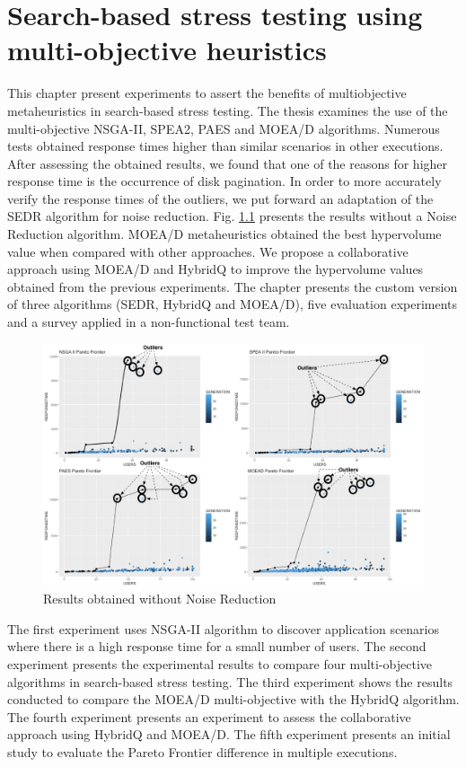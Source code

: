 \documentclass[espaco=umemeio,chapter=TITLE,twoside,openright]{abnt}
\begin{document}
\chapter{Search-based stress testing using multi-objective heuristics}

This chapter present experiments to assert the benefits of multiobjective metaheuristics in search-based stress testing. The thesis examines the use of the multi-objective NSGA-II, SPEA2, PAES and MOEA/D algorithms. Numerous tests obtained response times higher than similar scenarios in other executions. After assessing the obtained results, we found that one of the reasons for higher response time is the occurrence of disk pagination. In order to more accurately verify the response times of the outliers, we put forward an adaptation of the SEDR algorithm for noise reduction. Fig. \ref{fig:outliers} presents the results without a Noise Reduction algorithm.  MOEA/D metaheuristics obtained the best hypervolume value when compared with other approaches. We propose a collaborative approach using MOEA/D and HybridQ to improve the hypervolume values obtained from the previous experiments. The chapter presents the custom version of three algorithms (SEDR, HybridQ and MOEA/D), five evaluation experiments and a survey applied in a non-functional test team.


\begin{figure}[!h]
\centering
\includegraphics[width=1\textwidth]{./images/outliers.png}
\caption{Results obtained without Noise Reduction}
\label{fig:outliers}
\end{figure}


The first experiment uses NSGA-II algorithm to discover application scenarios where there is a high response time for a small number of users. The second experiment presents the experimental results to compare four multi-objective algorithms in search-based stress testing. The third experiment shows the results conducted to compare the MOEA/D multi-objective with the HybridQ algorithm. The fourth experiment presents an experiment to assess the collaborative approach using HybridQ and MOEA/D. The fifth experiment presents an initial study to evaluate the Pareto Frontier difference in multiple executions. 
\end{document}
